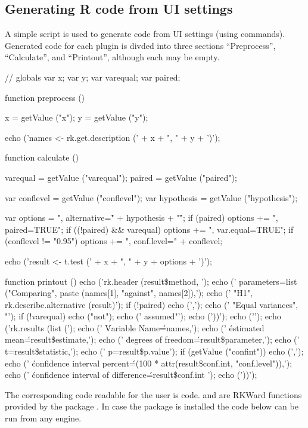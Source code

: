 \subsection{Generating R code from UI settings}
\label{sec:generating_r_code_from_ui_settings}
A simple  script is used to generate  code from UI settings (using  commands).
Generated code for each plugin is divded into three sections ``Preprocess'', ``Calculate'', and ``Printout'', although each
may be empty.
\begin{Code}
// globals
var x;
var y;
var varequal;
var paired;

function preprocess () {
  x = getValue ("x");
  y = getValue ("y");

  echo ('names <- rk.get.description (' + x + ", " + y + ')\n');
}

function calculate () {
  varequal = getValue ("varequal");
  paired = getValue ("paired");

  var conflevel = getValue ("conflevel");
  var hypothesis = getValue ("hypothesis");

  var options = ", alternative=\"" + hypothesis + "\"";
  if (paired) options += ", paired=TRUE";
  if ((!paired) && varequal) options += ", var.equal=TRUE";
  if (conflevel != "0.95") options += ", conf.level=" + conflevel;

  echo ('result <- t.test (' + x + ", " + y + options + ')\n');
}

function printout () {
  echo ('rk.header (result\$method, \n');
  echo ('  parameters=list ("Comparing", paste (names[1], "against", names[2]),\n');
  echo ('  "H1", rk.describe.alternative (result)');
  if (!paired) {
    echo (',\n');
    echo ('  "Equal variances", "');
    if (!varequal) echo ("not");
    echo (' assumed"');
  }
  echo ('))\n');
  echo ('\n');
  echo ('rk.results (list (\n');
  echo ('  \'Variable Name\'=names,\n');
  echo ('  \'estimated mean\'=result\$estimate,\n');
  echo ('  \'degrees of freedom\'=result\$parameter,\n');
  echo ('  t=result\$statistic,\n');
  echo ('  p=result\$p.value');
  if (getValue ("confint")) {
    echo (',\n');
    echo ('  \'confidence interval percent\'=(100 * attr(result\$conf.int, "conf.level")),\n');
    echo ('  \'confidence interval of difference\'=result\$conf.int ');
  }
  echo ('))\n');
}
\end{Code}

The corresponding code readable for the user is  code. and  
are RKWard functions provided by the package . In case the package is installed the code below 
can be run from any  engine.

